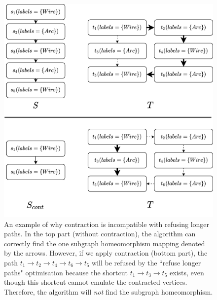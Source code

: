 \begin{figure}[H]
  \centering
\includegraphics[scale=0.1]{images/contraction/incompatibleWithLongerPaths.png}
 
\caption{An example of why contraction is incompatible with refusing longer paths. In the top part (without contraction), the algorithm can correctly find the one subgraph homeomorphism mapping denoted by the arrows. However, if we apply contraction (bottom part), the path $t_1 \to t_2 \to t_4 \to t_6 \to t_5$ will be refused by the ``refuse longer paths" optimisation because the shortcut $t_1 \to t_3 \to t_5$ exists, even though this shortcut cannot emulate the contracted vertices. Therefore, the algorithm will \textit{not} find the subgraph homeomorphism.}
\label{fig:incompatibleContractionRefuse}
\end{figure}





